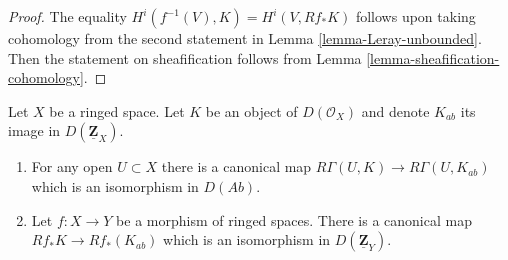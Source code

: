 \begin{proof}
The equality $H^i(f^{-1}(V), K) = H^i(V, Rf_*K)$ follows upon taking
cohomology from the second statement in
Lemma \ref{lemma-Leray-unbounded}. Then the statement on sheafification
follows from Lemma \ref{lemma-sheafification-cohomology}.
\end{proof}

\begin{lemma}
\label{lemma-modules-abelian-unbounded}
Let $X$ be a ringed space. Let $K$ be an object of $D(\mathcal{O}_X)$
and denote $K_{ab}$ its image in $D(\underline{\mathbf{Z}}_X)$.
\begin{enumerate}
\item For any open $U \subset X$ there is a canonical map
$R\Gamma(U, K) \to R\Gamma(U, K_{ab})$
which is an isomorphism in $D(\textit{Ab})$.
\item Let $f : X \to Y$ be a morphism of ringed spaces.
There is a canonical map $Rf_*K \to Rf_*(K_{ab})$ which
is an isomorphism in $D(\underline{\mathbf{Z}}_Y)$.
\end{enumerate}
\end{lemma}

